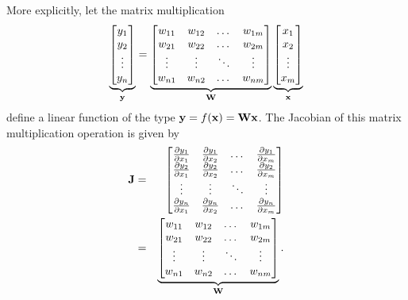 \documentclass[letterpaper,10pt,english]{jupyterBook}
\begin{document}
\sphinxAtStartPar
More explicitly, let the matrix multiplication
\label{equation:neuralnets_backprop:1ce198a6-abde-40e5-bcc3-26fa14eff8d8}\begin{equation}
\underbrace{\begin{bmatrix}
y_1 \\
y_2 \\
\vdots \\
y_n
\end{bmatrix}}_{\bf y}
=
\underbrace{\begin{bmatrix}
w_{11} & w_{12} & \dots  & w_{1m} \\
w_{21} & w_{22} & \dots  & w_{2m} \\
\vdots & \vdots & \ddots & \vdots \\
w_{n1} & w_{n2} & \dots  & w_{nm}
\end{bmatrix}}_{\bf W}
\underbrace{\begin{bmatrix}
x_1 \\
x_2 \\
\vdots \\
x_m
\end{bmatrix}}_{\bf x}
\end{equation}
\sphinxAtStartPar
define a linear function of the type \({\bf y} = f({\bf x}) = \mathbf{W} {\bf x}\). The Jacobian of this matrix multiplication operation is given by
\label{equation:neuralnets_backprop:11d9cfc1-6e40-4909-b90a-981664020b8a}\begin{eqnarray}
{\bf J}
&=&
\begin{bmatrix}
{\partial y_1 \over \partial x_1} & {\partial y_1 \over \partial x_2} & \dots  & {\partial y_1 \over \partial x_m} \\
{\partial y_2 \over \partial x_1} & {\partial y_2 \over \partial x_2} & \dots  & {\partial y_2 \over \partial x_m} \\
\vdots & \vdots & \ddots & \vdots \\
{\partial y_n \over \partial x_1} & {\partial y_n \over \partial x_2} & \dots  & {\partial y_n \over \partial x_m} \\
\end{bmatrix}  \\
&=&
\underbrace{\begin{bmatrix}
w_{11} & w_{12} & \dots  & w_{1m} \\
w_{21} & w_{22} & \dots  & w_{2m} \\
\vdots & \vdots & \ddots & \vdots \\
w_{n1} & w_{n2} & \dots  & w_{nm}
\end{bmatrix}}_{\bf W}. 
\end{eqnarray}
\end{document}
